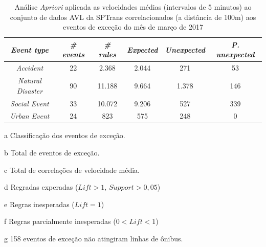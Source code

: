 \documentclass[
	12pt,				%
	oneside,			%
	a4paper,			%
	english,			%
	brazil				%
	]{abntex2ppgsi}
\begin{document}
\begin{apendicesenv}
\begin{table}[!htb]
\centering
\begin{threeparttable}
\caption {Análise \textit{Apriori} aplicada as velocidades médias (intervalos de 5 minutos) ao conjunto de dados AVL da SPTrans correlacionados (a distância de 100m) aos eventos de exceção do mês de março de 2017}
\label {tab:aprioriFull}
\begin{tabular}{c|c|c|c|c|c}
\hline
\textbf{\textit{Event type}}\tnote{a} & \textbf{\textit{\# events}}\tnote{b} & \textit{\textbf{\# rules}}\tnote{c} & \textbf{\textit{Expected}}\tnote{d} & \textbf{\textit{Unexpected}}\tnote{e} & \textbf{\textit{P. unexpected}}\tnote{f}   \\
\hline
\textit{Accident} & 22 & 2.368 & 2.044 & 271 & 53 \\
\textit{Natural Disaster} & 90 & 11.188 & 9.664 & 1.378 & 146 \\
\textit{Social Event} & 33 & 10.072 & 9.206 & 527 & 339 \\
\textit{Urban Event} & 24 & 823 & 575 & 248 & 0 \\
\hline
\end{tabular}
\begin{tablenotes}
            \item[a] Classificação dos eventos de exceção.
            \item[b] Total de eventos de exceção.
            \item[c] Total de correlações de velocidade média.
            \item[d] Regradas experadas ($Lift > 1$, $Support > 0,05$)
            \item[e] Regras inesperadas ($Lift = 1$)
            \item[f] Regras parcialmente inesperadas ($0 < Lift < 1$)
            \item[g] 158 eventos de exceção não atingiram linhas de ônibus.
        \end{tablenotes}
\end{threeparttable}
\end{table}



\end{apendicesenv}
\end{document}
